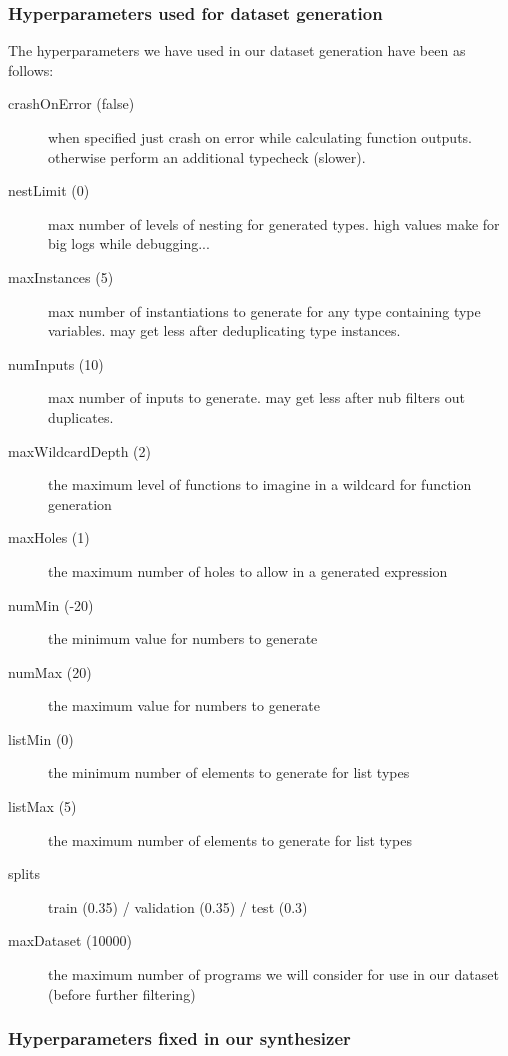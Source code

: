 \documentclass{article}
\begin{document}
\subsubsection{Hyperparameters used for dataset generation}

The hyperparameters we have used in our dataset generation have been as follows:
\begin{description}
    \item[crashOnError (false)] when specified just crash on error while calculating function outputs. otherwise perform an additional typecheck (slower).
    \item[nestLimit (0)] max number of levels of nesting for generated types. high values make for big logs while debugging...
    \item[maxInstances (5)] max number of instantiations to generate for any type containing type variables. may get less after deduplicating type instances.
    \item[numInputs (10)] max number of inputs to generate. may get less after nub filters out duplicates.
    \item[maxWildcardDepth (2)] the maximum level of functions to imagine in a wildcard for function generation
    \item[maxHoles (1)] the maximum number of holes to allow in a generated expression
    \item[numMin (-20)] the minimum value for numbers to generate
    \item[numMax (20)] the maximum value for numbers to generate
    \item[listMin (0)] the minimum number of elements to generate for list types
    \item[listMax (5)] the maximum number of elements to generate for list types
    \item[splits] train (0.35) / validation (0.35) / test (0.3)
    \item[maxDataset (10000)] the maximum number of programs we will consider for use in our dataset (before further filtering)
\end{description}

\subsubsection{Hyperparameters fixed in our synthesizer}
\end{document}
